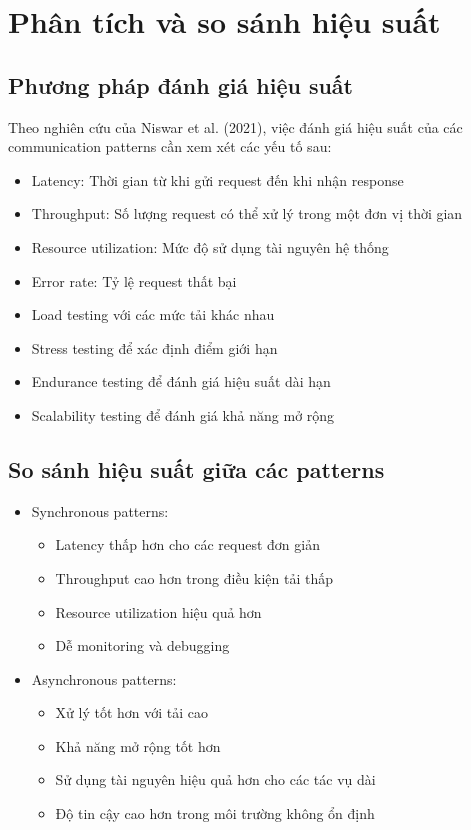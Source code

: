 \section{Phân tích và so sánh hiệu suất}

\subsection{Phương pháp đánh giá hiệu suất}
Theo nghiên cứu của Niswar et al. (2021), việc đánh giá hiệu suất của các communication patterns cần xem xét các yếu tố sau:

\begin{itemize}
    \item Latency: Thời gian từ khi gửi request đến khi nhận response
    \item Throughput: Số lượng request có thể xử lý trong một đơn vị thời gian
    \item Resource utilization: Mức độ sử dụng tài nguyên hệ thống
    \item Error rate: Tỷ lệ request thất bại
\end{itemize}

\begin{itemize}
    \item Load testing với các mức tải khác nhau
    \item Stress testing để xác định điểm giới hạn
    \item Endurance testing để đánh giá hiệu suất dài hạn
    \item Scalability testing để đánh giá khả năng mở rộng
\end{itemize}

\subsection{So sánh hiệu suất giữa các patterns}
\begin{itemize}
    \item Synchronous patterns:
    \begin{itemize}
        \item Latency thấp hơn cho các request đơn giản
        \item Throughput cao hơn trong điều kiện tải thấp
        \item Resource utilization hiệu quả hơn
        \item Dễ monitoring và debugging
    \end{itemize}
    
    \item Asynchronous patterns:
    \begin{itemize}
        \item Xử lý tốt hơn với tải cao
        \item Khả năng mở rộng tốt hơn
        \item Sử dụng tài nguyên hiệu quả hơn cho các tác vụ dài
        \item Độ tin cậy cao hơn trong môi trường không ổn định
    \end{itemize}
\end{itemize}

